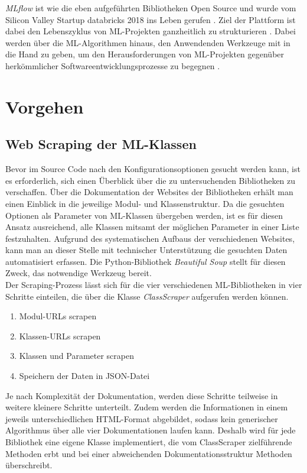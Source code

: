 \documentclass[german,bachelor]{swsLeipzig}
\begin{document}
\textit{MLflow} ist wie die eben aufgeführten Bibliotheken Open Source und wurde vom Silicon Valley Startup databricks 2018 ins Leben gerufen \cite[]{zaharia2018accelerating}.
Ziel der Plattform ist dabei den Lebenszyklus von ML-Projekten ganzheitlich zu strukturieren \cite[]{zaharia2018accelerating}.
Dabei werden über die ML-Algorithmen hinaus, den Anwendenden Werkzeuge mit in die Hand zu geben, um den Herausforderungen
von ML-Projekten gegenüber herkömmlicher Softwareentwicklungsprozesse zu begegnen \cite[]{zaharia2018accelerating}.\\

\section{Vorgehen}

\subsection{Web Scraping der ML-Klassen}
Bevor im Source Code nach den Konfigurationsoptionen gesucht werden kann, ist es erforderlich, sich einen Überblick über
die zu untersuchenden Bibliotheken zu verschaffen.
Über die Dokumentation der Websites der Bibliotheken erhält man einen Einblick in die jeweilige Modul- und Klassenstruktur.
Da die gesuchten Optionen als Parameter von ML-Klassen übergeben werden, ist es für diesen Ansatz ausreichend, alle Klassen
mitsamt der möglichen Parameter in einer Liste festzuhalten.
Aufgrund des systematischen Aufbaus der verschiedenen Websites, kann man an dieser Stelle mit technischer Unterstützung
die gesuchten Daten automatisiert erfassen.
Die Python-Bibliothek \textit{Beautiful Soup} stellt für diesen Zweck, das notwendige Werkzeug bereit.\\

Der Scraping-Prozess lässt sich für die vier verschiedenen ML-Bibliotheken in vier Schritte einteilen, die über die Klasse
\textit{ClassScraper} aufgerufen werden können.

\begin{enumerate}
 \item Modul-URLs scrapen
 \item Klassen-URLs scrapen
 \item Klassen und Parameter scrapen
 \item Speichern der Daten in JSON-Datei
\end{enumerate}

Je nach Komplexität der Dokumentation, werden diese Schritte teilweise in weitere kleinere Schritte unterteilt.
Zudem werden die Informationen in einem jeweils unterschiedlichen HTML-Format abgebildet,
sodass kein generischer Algorithmus über alle vier Dokumentationen laufen kann.
Deshalb wird für jede Bibliothek eine eigene Klasse implementiert, die vom ClassScraper zielführende Methoden erbt und
bei einer abweichenden Dokumentationsstruktur Methoden überschreibt. \\
\end{document}
